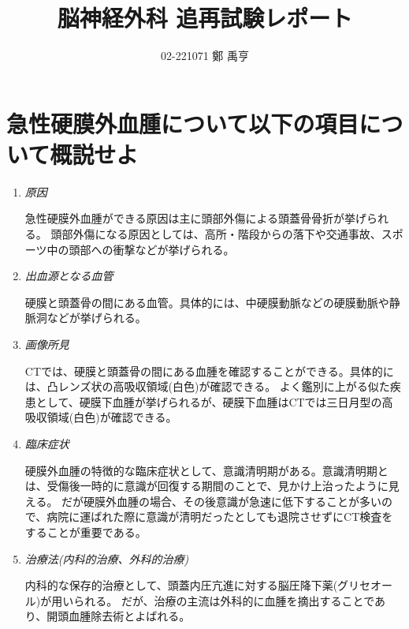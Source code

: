 \documentclass[a4paper,10.5pt]{jsarticle}
\begin{document}
\title{脳神経外科 追再試験レポート}
\author{02-221071 鄭 禹亨}
\date{}
\maketitle

\section{急性硬膜外血腫について以下の項目について概説せよ}
\begin{enumerate}
  \item \emph{原因}\par 急性硬膜外血腫ができる原因は主に頭部外傷による頭蓋骨骨折が挙げられる。
  頭部外傷になる原因としては、高所・階段からの落下や交通事故、スポーツ中の頭部への衝撃などが挙げられる。
  \item \emph{出血源となる血管}\par 硬膜と頭蓋骨の間にある血管。具体的には、中硬膜動脈などの硬膜動脈や静脈洞などが挙げられる。
  \item \emph{画像所見}\par CTでは、硬膜と頭蓋骨の間にある血腫を確認することができる。具体的には、凸レンズ状の高吸収領域(白色)が確認できる。
  よく鑑別に上がる似た疾患として、硬膜下血腫が挙げられるが、硬膜下血腫はCTでは三日月型の高吸収領域(白色)が確認できる。
  \item \emph{臨床症状}\par 硬膜外血腫の特徴的な臨床症状として、意識清明期がある。意識清明期とは、受傷後一時的に意識が回復する期間のことで、見かけ上治ったように見える。
  だが硬膜外血腫の場合、その後意識が急速に低下することが多いので、病院に運ばれた際に意識が清明だったとしても退院させずにCT検査をすることが重要である。
  \item \emph{\textup{治療法(内科的治療、外科的治療)}}\par 内科的な保存的治療として、頭蓋内圧亢進に対する脳圧降下薬(グリセオール)が用いられる。
  だが、治療の主流は外科的に血腫を摘出することであり、開頭血腫除去術とよばれる。 
\end{enumerate}
\end{document}
